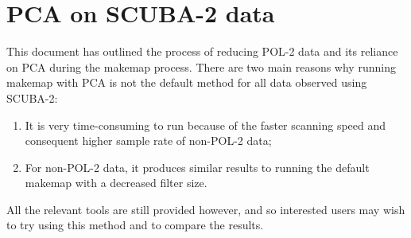 \chapter{PCA on SCUBA-2 data}
\label{app:pca}

This document has outlined the process of reducing POL-2 data and its
reliance on PCA during the makemap process. There are two main reasons
why running makemap with PCA is not the default method for all data observed
using SCUBA-2:

\begin{enumerate}
\item It is very time-consuming to run because of the faster scanning speed
and consequent higher sample rate of non-POL-2 data;
\item For non-POL-2 data, it produces similar results to running the default
makemap with a decreased filter size.
\end{enumerate}

All the relevant tools are still provided however, and so interested users
may wish to try using this method and to compare the results.
